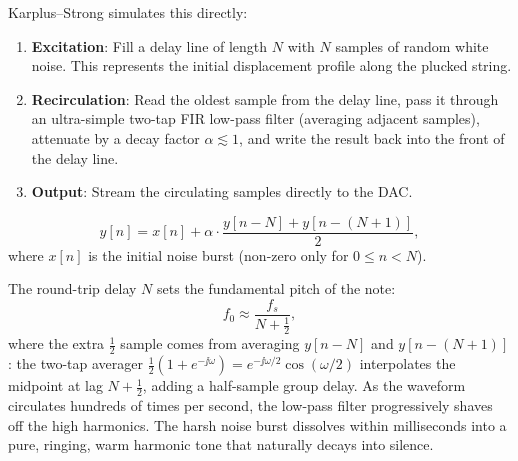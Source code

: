 Karplus--Strong simulates this directly:
\begin{enumerate}
  \item \textbf{Excitation}: Fill a delay line of length $N$ with $N$ samples of random white noise.
        This represents the initial displacement profile along the plucked string.
  \item \textbf{Recirculation}: Read the oldest sample from the delay line, pass it through an ultra-simple
        two-tap FIR low-pass filter (averaging adjacent samples), attenuate by a decay factor $\alpha \lesssim 1$,
        and write the result back into the front of the delay line.
  \item \textbf{Output}: Stream the circulating samples directly to the DAC.
\end{enumerate}

\begin{equation}
\label{ch28:ks-eq}
y[n] = x[n] + \alpha \cdot \frac{y[n-N] + y[n-(N+1)]}{2},
\end{equation}
where $x[n]$ is the initial noise burst (non-zero only for $0 \le n < N$).

The round-trip delay $N$ sets the fundamental pitch of the note:
\begin{equation}
\label{ch28:ks-pitch}
f_0 \approx \frac{f_s}{N + \tfrac{1}{2}},
\end{equation}
where the extra $\tfrac{1}{2}$ sample comes from averaging $y[n-N]$ and $y[n-(N+1)]$: the two-tap averager $\frac{1}{2}(1+e^{-\jj\omega}) = e^{-\jj\omega/2}\cos(\omega/2)$ interpolates the midpoint at lag $N + \tfrac{1}{2}$, adding a half-sample group delay.
As the waveform circulates hundreds of times per second, the low-pass filter progressively shaves off
the high harmonics. The harsh noise burst dissolves within milliseconds into a pure, ringing, warm
harmonic tone that naturally decays into silence.

